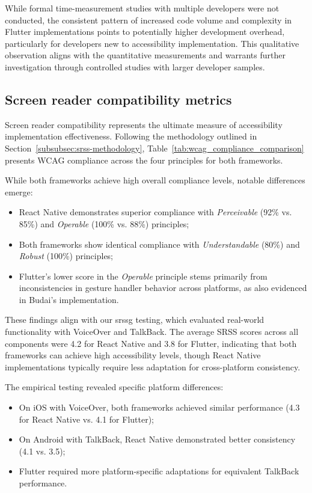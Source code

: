 {While formal time-measurement studies with multiple developers were not conducted, the consistent pattern of increased code volume and complexity in Flutter implementations points to potentially higher development overhead, particularly for developers new to accessibility implementation. This qualitative observation aligns with the quantitative measurements and warrants further investigation through controlled studies with larger developer samples.

\subsection{Screen reader compatibility metrics}
\label{subsec:screen-reader-metrics}

Screen reader compatibility represents the ultimate measure of accessibility implementation effectiveness. Following the methodology outlined in Section~\ref{subsubsec:srss-methodology}, Table~\ref{tab:wcag_compliance_comparison} presents WCAG compliance across the four principles for both frameworks.

While both frameworks achieve high overall compliance levels, notable differences emerge:

\begin{itemize}
    \item React Native demonstrates superior compliance with \textit{Perceivable} (92\% vs. 85\%) and \textit{Operable} (100\% vs. 88\%) principles;
    \item Both frameworks show identical compliance with \textit{Understandable} (80\%) and \textit{Robust} (100\%) principles;
    \item Flutter's lower score in the \textit{Operable} principle stems primarily from inconsistencies in gesture handler behavior across platforms, as also evidenced in Budai's implementation.
\end{itemize}

These findings align with our \gls{srssg} testing, which evaluated real-world functionality with VoiceOver and TalkBack. The average SRSS scores across all components were 4.2 for React Native and 3.8 for Flutter, indicating that both frameworks can achieve high accessibility levels, though React Native implementations typically require less adaptation for cross-platform consistency.

The empirical testing revealed specific platform differences:

\begin{itemize}
    \item On iOS with VoiceOver, both frameworks achieved similar performance (4.3 for React Native vs. 4.1 for Flutter);
    \item On Android with TalkBack, React Native demonstrated better consistency (4.1 vs. 3.5);
    \item Flutter required more platform-specific adaptations for equivalent TalkBack performance.
\end{itemize}

}
